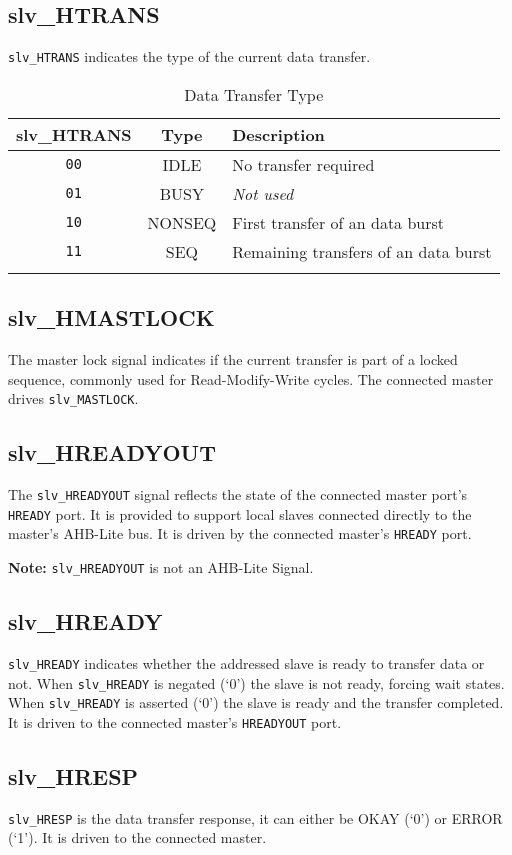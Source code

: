 \subsection{slv\_HTRANS}\label{slv_htrans}

\texttt{slv\_HTRANS} indicates the type of the current data transfer.

\begin{longtable}[]{@{}ccl@{}}
\toprule
slv\_HTRANS & Type & Description\tabularnewline
\midrule
\endhead
\texttt{00} & IDLE & No transfer required\tabularnewline
\texttt{01} & BUSY & \emph{Not used}\tabularnewline
\texttt{10} & NONSEQ & First transfer of an data burst\tabularnewline
\texttt{11} & SEQ & Remaining transfers of an data burst\tabularnewline
\bottomrule
\caption{Data Transfer Type}
\end{longtable}

\subsection{slv\_HMASTLOCK}\label{slv_hmastlock}

The master lock signal indicates if the current transfer is part of a
locked sequence, commonly used for Read-Modify-Write cycles. The
connected master drives \texttt{slv\_MASTLOCK}.

\subsection{slv\_HREADYOUT}\label{slv_hreadyout}

The \texttt{slv\_HREADYOUT} signal reflects the state of the connected master
port's \texttt{HREADY} port. It is provided to support local slaves connected
directly to the master's AHB-Lite bus. It is driven by the connected
master's \texttt{HREADY} port.

\textbf{Note:} \texttt{slv\_HREADYOUT} is not an AHB-Lite Signal.

\subsection{slv\_HREADY}\label{slv_hready}

\texttt{slv\_HREADY} indicates whether the addressed slave is ready to transfer
data or not. When \texttt{slv\_HREADY} is negated (`0') the slave is not ready,
forcing wait states. When \texttt{slv\_HREADY} is asserted (`0') the slave is
ready and the transfer completed. It is driven to the connected master's
\texttt{HREADYOUT} port.

\subsection{slv\_HRESP}\label{slv_hresp}

\texttt{slv\_HRESP} is the data transfer response, it can either be OKAY (`0') or
ERROR (`1'). It is driven to the connected master.
